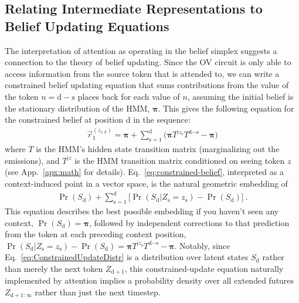 \documentclass{article}
\theoremstyle{plain}
\theoremstyle{definition}
\theoremstyle{remark}
\newcommand{\stationary}{\boldsymbol{\pi}}
\begin{document}
\subsection{Relating Intermediate Representations to Belief Updating Equations}

The interpretation of attention as operating in the belief simplex suggests a connection to the theory of belief updating.
Since the OV circuit is only able to access information from the source token that is attended to, we can write a constrained belief updating equation that sums contributions from the value of the token $n = \text{d} - \text{s}$ places back for each value of $n$, assuming the initial belief is the stationary distribution of the HMM, $\stationary$.
This gives the following equation for the constrained belief at position d in the sequence:
 \begin{align}
     \vec{r}_1^{(z_{1:\text{d}})} = \stationary  + \sum_{\text{s}=1}^{\text{d}} \bigl( \stationary T^{|z_{\text{s}}} T^{\text{d}-\text{s}} - \stationary \bigr)
     \label{eq:constrained-belief}
 \end{align}
 where $T$ is the HMM's hidden state transition matrix (marginalizing out the emissions), and $T^{|z}$ is the HMM transition matrix conditioned on seeing token $z$ 
 (see App.~\ref{apx:math} 
 for details).
Eq.~\eqref{eq:constrained-belief}, 
interpreted as a context-induced point in a vector space,
is the natural geometric embedding of 
\begin{align}
\Pr(S_{\text{d}}) 
 + \sum_{\text{s}=1}^{\text{d}} \bigl[ \Pr(S_{\text{d}} | Z_{\text{s}} \! = \! z_{\text{s}} )  -  \Pr(S_{\text{d}}) \bigr] 
 ~.
 \label{eq:ConstrainedUpdateDistr}
 \end{align}
 This equation describes the best possible embedding if you haven’t seen any context, 
$\Pr(S_{\text{d}} ) = \stationary $, followed by %
independent corrections to that prediction from the token at each preceding context position, $\Pr(S_{\text{d}} | Z_{\text{s}} = z_{\text{s}} ) - \Pr(S_{\text{d}}) = \stationary T^{|z_{\text{s}}} T^{\text{d} - \text{s}} - \stationary$.
Notably, since Eq.~\eqref{eq:ConstrainedUpdateDistr} 
is a distribution over latent states $S_{\text{d}}$ rather than merely the next token $Z_{\text{d}+1}$, this constrained-update equation naturally implemented by attention implies a probability density over all extended futures 
$Z_{\text{d}+1:\infty}$
rather than just the next timestep.
\end{document}
